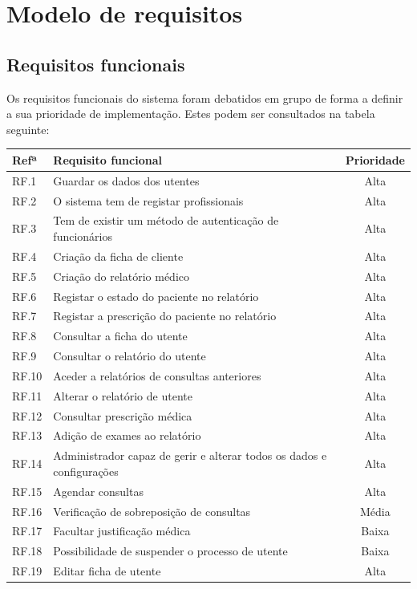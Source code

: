 \documentclass[11pt,a4paper,twoside]{report}
\begin{document}
\chapter{Modelo de requisitos}

\section{Requisitos funcionais }

Os requisitos funcionais do sistema foram debatidos em grupo de forma a definir a sua prioridade de implementação.
Estes podem ser consultados na tabela seguinte:

\begin{tabularx}{\textwidth}{|l|X|c|}
	\hline
\textbf{Refª} 	& \textbf{Requisito funcional}   & \textbf{Prioridade}  \\
	\hline
RF.1 	& Guardar os dados dos utentes  & Alta  \\
	\hline
RF.2	& O sistema tem de registar profissionais  & Alta \\
	\hline
RF.3	& Tem de existir um método de autenticação de funcionários  & Alta \\
	\hline
RF.4	& Criação da ficha de cliente  & Alta  \\
	\hline
RF.5	& Criação do relatório médico  & Alta \\
	\hline
RF.6	& Registar o estado do paciente no relatório  & Alta \\
	\hline
RF.7	& Registar a prescrição do paciente no relatório  & Alta \\
	\hline
RF.8	& Consultar a ficha do utente  & Alta \\
	\hline
RF.9	& Consultar o relatório do utente  & Alta \\
	\hline
RF.10	& Aceder a relatórios de consultas anteriores  & Alta \\
	\hline
RF.11	& Alterar o relatório de utente  & Alta  \\
	\hline
RF.12	& Consultar prescrição médica  & Alta  \\
	\hline
RF.13	& Adição de exames ao relatório  & Alta  \\
	\hline
RF.14	& Administrador capaz de gerir e alterar todos os dados e configurações  & Alta \\
	\hline
RF.15	& Agendar consultas  & Alta \\
	\hline
RF.16	& Verificação de sobreposição de consultas  & Média \\
	\hline
RF.17	& Facultar justificação médica   & Baixa \\
	\hline
RF.18	& Possibilidade de suspender o processo de utente  & Baixa \\
	\hline
RF.19	& Editar ficha de utente  & Alta \\
	\hline
\end{tabularx}
\end{document}
